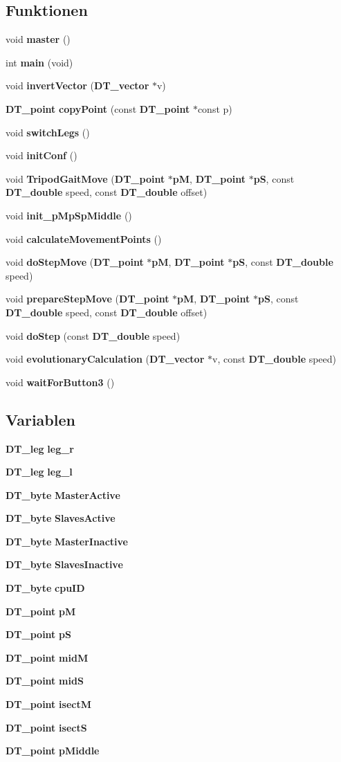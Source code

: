 \subsection*{Funktionen}
\begin{DoxyCompactItemize}
\item 
void {\bf master} ()
\item 
int {\bf main} (void)
\item 
void {\bf invertVector} ({\bf DT\_\-vector} $\ast$v)
\item 
{\bf DT\_\-point} {\bf copyPoint} (const {\bf DT\_\-point} $\ast$const p)
\item 
void {\bf switchLegs} ()
\item 
void {\bf initConf} ()
\item 
void {\bf TripodGaitMove} ({\bf DT\_\-point} $\ast${\bf pM}, {\bf DT\_\-point} $\ast${\bf pS}, const {\bf DT\_\-double} speed, const {\bf DT\_\-double} offset)
\item 
void {\bf init\_\-pMpSpMiddle} ()
\item 
void {\bf calculateMovementPoints} ()
\item 
void {\bf doStepMove} ({\bf DT\_\-point} $\ast${\bf pM}, {\bf DT\_\-point} $\ast${\bf pS}, const {\bf DT\_\-double} speed)
\item 
void {\bf prepareStepMove} ({\bf DT\_\-point} $\ast${\bf pM}, {\bf DT\_\-point} $\ast${\bf pS}, const {\bf DT\_\-double} speed, const {\bf DT\_\-double} offset)
\item 
void {\bf doStep} (const {\bf DT\_\-double} speed)
\item 
void {\bf evolutionaryCalculation} ({\bf DT\_\-vector} $\ast$v, const {\bf DT\_\-double} speed)
\item 
void {\bf waitForButton3} ()
\end{DoxyCompactItemize}
\subsection*{Variablen}
\begin{DoxyCompactItemize}
\item 
{\bf DT\_\-leg} {\bf leg\_\-r}
\item 
{\bf DT\_\-leg} {\bf leg\_\-l}
\item 
{\bf DT\_\-byte} {\bf MasterActive}
\item 
{\bf DT\_\-byte} {\bf SlavesActive}
\item 
{\bf DT\_\-byte} {\bf MasterInactive}
\item 
{\bf DT\_\-byte} {\bf SlavesInactive}
\item 
{\bf DT\_\-byte} {\bf cpuID}
\item 
{\bf DT\_\-point} {\bf pM}
\item 
{\bf DT\_\-point} {\bf pS}
\item 
{\bf DT\_\-point} {\bf midM}
\item 
{\bf DT\_\-point} {\bf midS}
\item 
{\bf DT\_\-point} {\bf isectM}
\item 
{\bf DT\_\-point} {\bf isectS}
\item 
{\bf DT\_\-point} {\bf pMiddle}
\end{DoxyCompactItemize}


